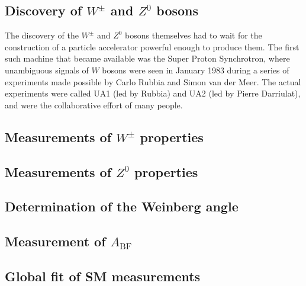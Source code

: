 \documentclass[../../main/main.tex]{subfiles}
\begin{document}
\subsection{Discovery of \( W^{\pm} \) and \( Z^0 \) bosons}
The discovery of the \( W^{\pm} \) and \( Z^0 \) bosons themselves had to wait for the construction of a particle accelerator powerful enough to produce them. The first such machine that became available was the Super Proton Synchrotron, where unambiguous signals of \( W \) bosons were seen in January 1983 during a series of experiments made possible by Carlo Rubbia and Simon van der Meer. The actual experiments were called UA1 (led by Rubbia) and UA2 (led by Pierre Darriulat), and were the collaborative effort of many people.



\subsection{Measurements of \( W^{\pm} \) properties}



\subsection{Measurements of \( Z^0 \) properties}



\subsection{Determination of the Weinberg angle}



\subsection{Measurement of \( A_\mathrm{BF} \)}



\subsection{Global fit of SM measurements}
\end{document}
